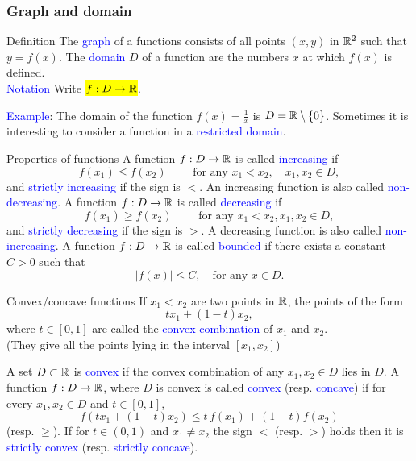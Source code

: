 \documentclass[11pt,aspectratio=169]{beamer}
\begin{document}
\begin{frame}
\frametitle{Graph and domain}
\begin{block}{Definition}
The \textcolor{blue}{graph} of a functions consists of all points $(x,y)$ in $\mathbb R^2$ such that $y=f(x)$.
\vskip 12pt
The \textcolor{blue}{domain} $D$ of a function are the numbers $x$ at which $f(x)$ is defined. \\[5mm]\textcolor{blue}{Notation} Write \hl{$f:D \rightarrow \mathbb R$}.	
\end{block}
\bigskip

\textcolor{blue}{Example}: The domain of the function $f(x)=\frac{1}{x}$ is $D=\mathbb R \setminus \{0\}$. 
\vskip 12pt
Sometimes it is interesting to consider a function in a \textcolor{blue}{restricted domain}.

\end{frame}


\begin{frame}{
Properties of functions}
A function $f:D \rightarrow \mathbb R$ is called \textcolor{blue}{increasing} if 
$$
f(x_1)\leq f(x_2) \qquad \text{ for any } x_1<x_2,\quad  x_1,x_2 \in D,
$$
 and \textcolor{blue}{strictly increasing} if the sign is $<$. An increasing function is also called \textcolor{blue}{non-decreasing}.
\vskip 12pt
 A function $f:D \rightarrow \mathbb R$ is called \textcolor{blue}{decreasing} if $$
f(x_1)\geq f(x_2) \qquad \text{ for any } x_1<x_2, x_1,x_2 \in D,
$$ and \textcolor{blue}{strictly decreasing} if the sign is $>$.
A decreasing function is also called \textcolor{blue}{non-increasing}.
\vskip 12pt
 A function $f:D \rightarrow \mathbb R$ is called \textcolor{blue}{bounded} if there exists a constant $C>0$ such that
$$\vert f(x) \vert \leq C,\quad \text{for any } x \in D.$$ 
\end{frame}

\begin{frame}{Convex/concave functions}
If $x_1<x_2$ are two points in $\mathbb R$, the points of the form 
$$t x_1+(1-t)x_2,$$ where $t \in [0,1]$ are called the \textcolor{blue}{convex combination} of $x_1$ and $x_2$.\\ {\scriptsize (They give all the points lying in the interval $[x_1,x_2]$)}

\vskip 12pt
A set $D\subset \mathbb R$ is \textcolor{blue}{convex} if the convex combination of any $x_1,x_2 \in D$ lies in $D$.
\vskip 12pt
A function $f:D \rightarrow \mathbb R$, where $D$ is convex is called \textcolor{blue}{convex} (resp. \textcolor{blue}{concave}) if for every  $x_1,x_2 \in D$ and $t \in [0,1]$, 
$$f(t x_1+(1-t)x_2)\leq t\, f(x_1)+(1-t) f(x_2)$$
(resp. $\geq$). If for $t \in (0,1)$ and $x_1 \neq x_2$ the sign $<$ (resp. $>$) holds then it is \textcolor{blue}{strictly convex} (resp. \textcolor{blue}{strictly concave}).
\end{frame}
\end{document}
